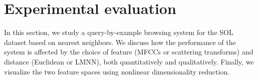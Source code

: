 \section{Experimental evaluation} \label{sec:exp}
In this section, we study a query-by-example browsing system for the SOL dataset based on nearest neighbors.
We discuss how the performance of the system is affected by the choice of feature (MFCCs or scattering transforms) and distance (Euclidean or LMNN), both quantitatively and qualitatively.
Finally, we visualize the two feature spaces using nonlinear dimensionality reduction.






